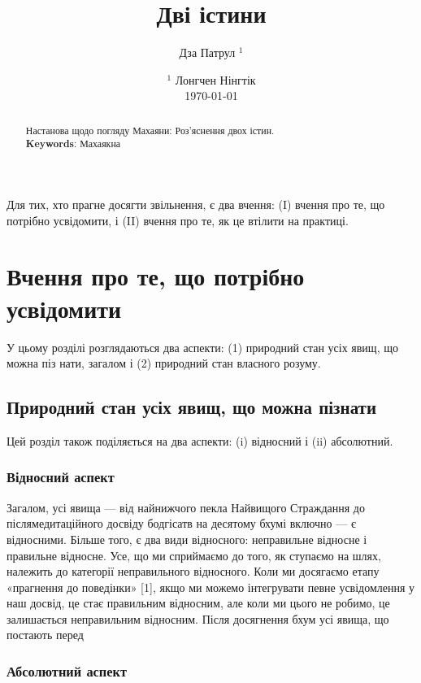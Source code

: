 \documentclass{article}
\begin{document}
\title{Дві істини}
\author{Дза Патрул $^1$}
\date{ $^1$ Лонгчен Нінгтік \\ \today }

\maketitle

\begin{abstract}Настанова щодо погляду Махаяни: Роз’яснення двох істин. \\
\textbf{Keywords}: Махаякна
\end{abstract}

\ifincludeTOC
  \tableofcontents
\fi

\newpage

Для тих, хто прагне досягти звільнення, є два вчення: (I) вчення про те, що потрібно усвідомити, і (II) вчення про те, як це втілити на практиці.

\section{Вчення про те, що потрібно усвідомити}

У цьому розділі розглядаються два аспекти: (1) природний стан усіх явищ, що можна піз нати, загалом і (2) природний стан власного розуму.

\subsection{Природний стан усіх явищ, що можна пізнати}

Цей розділ також поділяється на два аспекти: (i) відносний і (ii) абсолютний.


\subsubsection{Відносний аспект}
Загалом, усі явища — від найнижчого пекла Найвищого Страждання до післямедитаційного досвіду бодгісатв на десятому бхумі включно — є відносними. Більше того, є два види відносного: неправильне відносне і правильне відносне. Усе, що ми сприймаємо до того, як ступаємо на шлях, належить до категорії неправильного відносного. Коли ми досягаємо етапу «прагнення до поведінки» [1], якщо ми можемо інтегрувати певне усвідомлення у наш досвід, це стає правильним відносним, але коли ми цього не робимо, це залишається неправильним відносним. Після досягнення бхум усі явища, що постають перед

\subsubsection{Абсолютний аспект}
\end{document}
